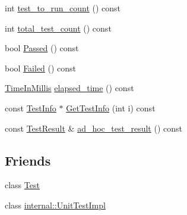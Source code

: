 \begin{DoxyCompactItemize}
\item 
int \hyperlink{classtesting_1_1TestCase_a47de0cf87858370388275c9d995f1ff4}{test\-\_\-to\-\_\-run\-\_\-count} () const 
\item 
int \hyperlink{classtesting_1_1TestCase_ac7b2ed22822735b7b9ae2740162332c9}{total\-\_\-test\-\_\-count} () const 
\item 
bool \hyperlink{classtesting_1_1TestCase_ad093a04334d7eb8d707a7f1a321b040f}{Passed} () const 
\item 
bool \hyperlink{classtesting_1_1TestCase_a5c0922d310f860e78cca7e215f2fa0e4}{Failed} () const 
\item 
\hyperlink{namespacetesting_a992de1d091ce660f451d1e8b3ce30fd6}{Time\-In\-Millis} \hyperlink{classtesting_1_1TestCase_a80f163d2826ba8586fffb41e8d686727}{elapsed\-\_\-time} () const 
\item 
const \hyperlink{classtesting_1_1TestInfo}{Test\-Info} $\ast$ \hyperlink{classtesting_1_1TestCase_a17dfa2a9fde64f5add3615e9426e81e1}{Get\-Test\-Info} (int i) const 
\item 
const \hyperlink{classtesting_1_1TestResult}{Test\-Result} \& \hyperlink{classtesting_1_1TestCase_a3993481a8f0c2253653b5e1ec5934432}{ad\-\_\-hoc\-\_\-test\-\_\-result} () const 
\end{DoxyCompactItemize}
\subsection*{Friends}
\begin{DoxyCompactItemize}
\item 
class \hyperlink{classtesting_1_1TestCase_a5b78b1c2e1fa07ffed92da365593eaa4}{Test}
\item 
class \hyperlink{classtesting_1_1TestCase_acc0a5e7573fd6ae7ad1878613bb86853}{internal\-::\-Unit\-Test\-Impl}
\end{DoxyCompactItemize}


